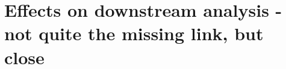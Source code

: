 \section[Effects on downstream analysis]{Effects on downstream analysis - not quite the missing link, but close}
\label{variantcalling-sec:downstream}